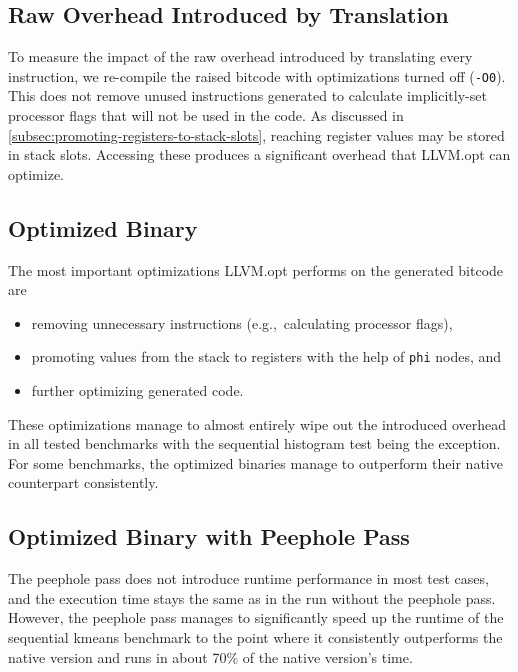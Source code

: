 \subsection{Raw Overhead Introduced by Translation}\label{subsec:raw-overhead-introduced-by-translation}

To measure the impact of the raw overhead introduced by translating every instruction, we re-compile the raised bitcode with optimizations turned off (\texttt{-O0}).
This does not remove unused instructions generated to calculate implicitly-set processor flags that will not be used in the code.
As discussed in \cref{subsec:promoting-registers-to-stack-slots}, reaching register values may be stored in stack slots.
Accessing these produces a significant overhead that LLVM.opt can optimize.

\subsection{Optimized Binary}\label{subsec:optimized-binary}

The most important optimizations LLVM.opt performs on the generated bitcode are
\begin{itemize}
    \item removing unnecessary instructions (e.g.,\ calculating processor flags),
    \item promoting values from the stack to registers with the help of \texttt{phi} nodes, and
    \item further optimizing generated code.
\end{itemize}

These optimizations manage to almost entirely wipe out the introduced overhead in all tested benchmarks with the sequential histogram test being the exception.
For some benchmarks, the optimized binaries manage to outperform their native counterpart consistently.

\subsection{Optimized Binary with Peephole Pass}\label{subsec:optimized-binary-with-peephole-pass}

The peephole pass does not introduce runtime performance in most test cases, and the execution time stays the same as in the run without the peephole pass.
However, the peephole pass manages to significantly speed up the runtime of the sequential kmeans benchmark to the point where it consistently outperforms the native version and runs in about 70\% of the native version's time.

